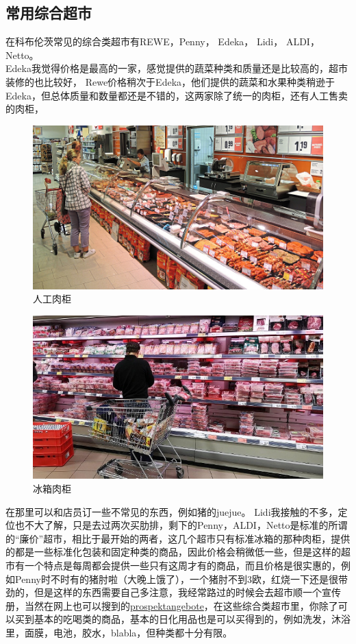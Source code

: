 \documentclass[doku]{subfiles}
\begin{document}
	\subsection{常用综合超市}
	在科布伦茨常见的综合类超市有REWE，Penny， Edeka， Lidi， ALDI，Netto。\\
	Edeka我觉得价格是最高的一家，感觉提供的蔬菜种类和质量还是比较高的，超市装修的也比较好， Rewe价格稍次于Edeka，他们提供的蔬菜和水果种类稍逊于Edeka，但总体质量和数量都还是不错的，这两家除了统一的肉柜，还有人工售卖的肉柜，
	
	\begin{figure}
		\centering
		\includegraphics[width=0.7\linewidth]{Fleischtheke-bei-Rewe-154924}
		\caption{人工肉柜}
		\label{fig:fleischtheke-bei-rewe-154924}
	\end{figure}
	\begin{figure}
		\centering
		\includegraphics[width=0.7\linewidth]{Regal-Fleisch}
		\caption{冰箱肉柜}
		\label{fig:regal-fleisch}
	\end{figure}
	
	在那里可以和店员订一些不常见的东西，例如猪的juejue。 Lidi我接触的不多，定位也不大了解，只是去过两次买肋排，剩下的Penny，ALDI，Netto是标准的所谓的“廉价”超市，相比于最开始的两者，这几个超市只有标准冰箱的那种肉柜，提供的都是一些标准化包装和固定种类的商品，因此价格会稍微低一些，但是这样的超市有一个特点是每周都会提供一些只有这周才有的商品，而且价格是很实惠的，例如Penny时不时有的猪肘啦（大晚上饿了），一个猪肘不到3欧，红烧一下还是很带劲的，但是这样的东西需要自己多注意，我经常路过的时候会去超市顺一个宣传册，当然在网上也可以搜到的\href{https://www.prospektangebote.de/}{prospektangebote}，在这些综合类超市里，你除了可以买到基本的吃喝类的商品，基本的日化用品也是可以买得到的，例如洗发，沐浴里，面膜，电池，胶水，blabla，但种类都十分有限。
	
\end{document}
